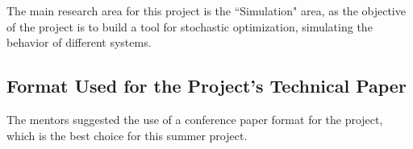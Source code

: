 \documentclass[a4paper]{journal}
\begin{document}
The main research area for this project is the ``Simulation" area, as the objective of the project is to build a tool for stochastic optimization, simulating the behavior of different systems.

\subsection{Format Used for the Project's Technical Paper}

The mentors suggested the use of a conference paper format for the project, which is the best choice for this summer project.
\end{document}
